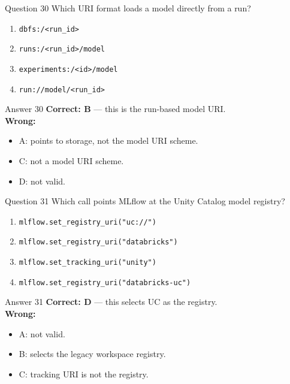 \documentclass[aspectratio=169,11pt]{beamer}
\begin{document}
	\begin{frame}{Question 30}
		Which URI format loads a model directly from a run?
		\begin{enumerate}[label=\Alph*.]
			\item \texttt{dbfs:/<run\_id>}
			\item \texttt{runs:/<run\_id>/model}
			\item \texttt{experiments:/<id>/model}
			\item \texttt{run://model/<run\_id>}
		\end{enumerate}
	\end{frame}
	\begin{frame}{Answer 30}
		\textbf{Correct: B} --- this is the run-based model URI.\\
		\vspace{0.5em}
		\textbf{Wrong:}
		\begin{itemize}
			\item A: points to storage, not the model URI scheme.
			\item C: not a model URI scheme.
			\item D: not valid.
		\end{itemize}
	\end{frame}
	
	\begin{frame}{Question 31}
		Which call points MLflow at the Unity Catalog model registry?
		\begin{enumerate}[label=\Alph*.]
			\item \texttt{mlflow.set\_registry\_uri("uc://")}
			\item \texttt{mlflow.set\_registry\_uri("databricks")}
			\item \texttt{mlflow.set\_tracking\_uri("unity")}
			\item \texttt{mlflow.set\_registry\_uri("databricks-uc")}
		\end{enumerate}
	\end{frame}
	\begin{frame}{Answer 31}
		\textbf{Correct: D} --- this selects UC as the registry.\\
		\vspace{0.5em}
		\textbf{Wrong:}
		\begin{itemize}
			\item A: not valid.
			\item B: selects the legacy workspace registry.
			\item C: tracking URI is not the registry.
		\end{itemize}
	\end{frame}
	
\end{document}
